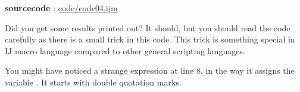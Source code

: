 \textbf{sourcecode} : \href{http://www.example.com/contents}{code/code04.ijm}

Did you get some results printed out? It should, but you should read the code carefully as there is a small trick in this code.  This trick is something special in IJ macro language compared to other general scripting languages.

You might have noticed a strange expression at line 8, in the way it assigns the variable . 
It starts with double quotation marks. \\